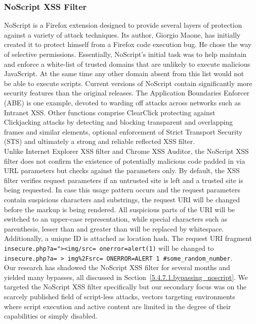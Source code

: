     \subsubsection{NoScript XSS Filter}
    \label{subsubsec:4.4.4.noscript_xss_filter}

    NoScript is a Firefox extension designed to provide several layers of protection against a variety of attack techniques. Its author, Giorgio Maone, has initially created it to protect himself from a Firefox code execution bug. He chose the way of selective permissions. Essentially, NoScript's initial task was to help maintain and enforce a white-list of trusted domains that are unlikely to execute malicious JavaScript. At the same time any other domain absent from this list would not be able to execute scripts. Current versions of NoScript contain significantly more security features than the original releases. The Application Boundaries Enforcer (ABE) is one example, devoted to warding off attacks across networks such as Intranet XSS. Other functions comprise ClearClick protecting against Clickjacking attacks by detecting and blocking transparent and overlapping frames and similar elements, optional enforcement of Strict Transport Security (STS) and ultimately a strong and  reliable reflected XSS filter.
\\ 

    Unlike Internet Explorer XSS filter and Chrome XSS Auditor, the NoScript XSS filter does not confirm the existence of potentially malicious code padded in via URL parameters but checks against the parameters only. By default, the XSS filter verifies request parameters if an untrusted site is left and a trusted site is being requested. In case this usage pattern occurs and the request parameters contain suspicious characters and substrings, the request URI will be changed before the markup is being rendered. All suspicious parts of the URI will be switched to an upper-case representation, while special characters such as parenthesis, lesser than and greater than will be replaced by whitespace. Additionally, a unique ID is attached as location hash. The request URI fragment \texttt{insecure.php?a="><img/src= onerror=alert(1)} will be changed to \texttt{insecure.php?a= > img\%2Fsrc= ONERROR=ALERT 1 \#some\_random\_number}. \\

    Our research has shadowed the NoScript XSS filter for several months and yielded many bypasses, all discussed in Section~\ref{5.4.7.1.bypassing_noscript}. We targeted the NoScript XSS filter specifically but our secondary focus was on the scarcely published field of script-less attacks, vectors targeting environments where script execution and active content are limited in the degree of their capabilities or simply disabled.

